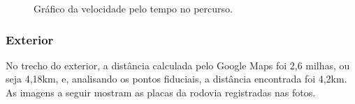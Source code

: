 \documentclass{article}
\begin{document}
\begin{figure}[!h]
    \centering
    \quad
    \caption{Gráfico da velocidade pelo tempo no percurso.}
\end{figure}





\subsubsection{Exterior}

\qquad No trecho do exterior, a distância calculada pelo Google Maps foi 2,6 milhas, ou seja 4,18km,  e, analisando os pontos fiduciais, a distância encontrada foi 4,2km. As imagens a seguir mostram as placas da rodovia registradas nas fotos.
\end{document}
